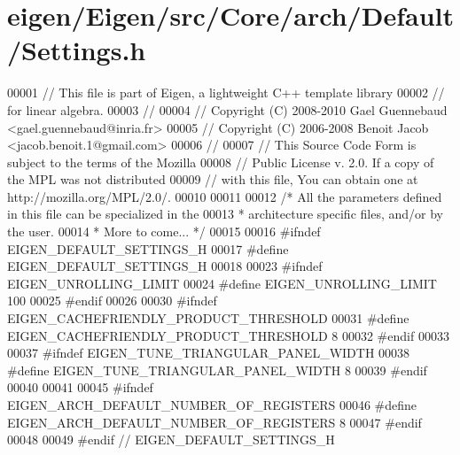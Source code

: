 \hypertarget{eigen_2_eigen_2src_2_core_2arch_2_default_2_settings_8h_source}{}\section{eigen/\+Eigen/src/\+Core/arch/\+Default/\+Settings.h}
\label{eigen_2_eigen_2src_2_core_2arch_2_default_2_settings_8h_source}

\begin{DoxyCode}
00001 \textcolor{comment}{// This file is part of Eigen, a lightweight C++ template library}
00002 \textcolor{comment}{// for linear algebra.}
00003 \textcolor{comment}{//}
00004 \textcolor{comment}{// Copyright (C) 2008-2010 Gael Guennebaud <gael.guennebaud@inria.fr>}
00005 \textcolor{comment}{// Copyright (C) 2006-2008 Benoit Jacob <jacob.benoit.1@gmail.com>}
00006 \textcolor{comment}{//}
00007 \textcolor{comment}{// This Source Code Form is subject to the terms of the Mozilla}
00008 \textcolor{comment}{// Public License v. 2.0. If a copy of the MPL was not distributed}
00009 \textcolor{comment}{// with this file, You can obtain one at http://mozilla.org/MPL/2.0/.}
00010 
00011 
00012 \textcolor{comment}{/* All the parameters defined in this file can be specialized in the}
00013 \textcolor{comment}{ * architecture specific files, and/or by the user.}
00014 \textcolor{comment}{ * More to come... */}
00015 
00016 \textcolor{preprocessor}{#ifndef EIGEN\_DEFAULT\_SETTINGS\_H}
00017 \textcolor{preprocessor}{#define EIGEN\_DEFAULT\_SETTINGS\_H}
00018 
00023 \textcolor{preprocessor}{#ifndef EIGEN\_UNROLLING\_LIMIT}
00024 \textcolor{preprocessor}{#define EIGEN\_UNROLLING\_LIMIT 100}
00025 \textcolor{preprocessor}{#endif}
00026 
00030 \textcolor{preprocessor}{#ifndef EIGEN\_CACHEFRIENDLY\_PRODUCT\_THRESHOLD}
00031 \textcolor{preprocessor}{#define EIGEN\_CACHEFRIENDLY\_PRODUCT\_THRESHOLD 8}
00032 \textcolor{preprocessor}{#endif}
00033 
00037 \textcolor{preprocessor}{#ifndef EIGEN\_TUNE\_TRIANGULAR\_PANEL\_WIDTH}
00038 \textcolor{preprocessor}{#define EIGEN\_TUNE\_TRIANGULAR\_PANEL\_WIDTH 8}
00039 \textcolor{preprocessor}{#endif}
00040 
00041 
00045 \textcolor{preprocessor}{#ifndef EIGEN\_ARCH\_DEFAULT\_NUMBER\_OF\_REGISTERS}
00046 \textcolor{preprocessor}{#define EIGEN\_ARCH\_DEFAULT\_NUMBER\_OF\_REGISTERS 8}
00047 \textcolor{preprocessor}{#endif}
00048 
00049 \textcolor{preprocessor}{#endif // EIGEN\_DEFAULT\_SETTINGS\_H}
\end{DoxyCode}
